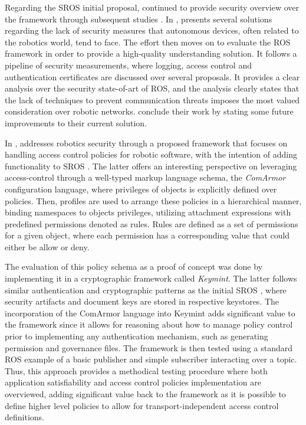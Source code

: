 Regarding the SROS \cite{white2016sros} initial proposal, \citeauthor{white2018procedurally} continued to provide security overview over the framework through subsequent studies \cite{white2018procedurally, white2019network}. In , \citeauthor*{caiazza2019enhancing} presents several solutions regarding the lack of security measures that autonomous devices, often related to the robotics world, tend to face. The effort then moves on to evaluate the ROS framework in order to provide a high-quality understanding solution. It follows a pipeline of security measurements, where logging, access control and authentication certificates are discussed over several proposals. It provides a clear analysis over the security state-of-art of ROS, and the analysis clearly states that the lack of techniques to prevent communication threats imposes the most valued consideration over robotic networks. \citeauthor*{caiazza2019enhancing} conclude their work by stating some future improvements to their current solution. 

In , \citeauthor*{white2018procedurally} addresses robotics security through a proposed framework that focuses on handling access control policies for robotic software, with the intention of adding functionality to SROS \cite{white2016sros}. The latter offers an interesting perspective on leveraging access-control through a well-typed markup language schema, the \textit{ComArmor} configuration language, where privileges of objects is explicitly defined over policies. Then, profiles are used to arrange these policies in a hierarchical manner, binding namespaces to objects privileges, utilizing attachment expressions with predefined permissions denoted as rules. Rules are defined as a set of permissions for a given object, where each permission has a corresponding value that could either be allow or deny. 

The evaluation of this policy schema as a proof of concept was done by implementing it in a cryptographic framework called \textit{Keymint}. The latter follows similar authentication and cryptographic patterns as the initial SROS \cite{white2016sros}, where security artifacts and document keys are stored in respective keystores. The incorporation of the ComArmor language into Keymint adds significant value to the framework since it allows for reasoning about how to manage policy control prior to implementing any authentication mechanism, such as generating permission and governance files. The framework is then tested using a standard ROS example of a basic publisher and simple subscriber interacting over a topic. Thus, this approach provides a methodical testing procedure where both application satisfiability and access control policies implementation are overviewed, adding significant value back to the framework as it is possible to define higher level policies to allow for transport-independent access control definitions.

